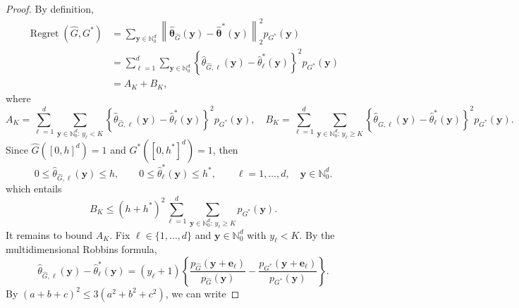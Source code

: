 \documentclass[twoside,12pt]{article}
\begin{document}
\begin{proof}
By definition,
\begin{align*}
    \operatorname{Regret}(\widehat G,G^\ast)
&=
\sum_{\boldsymbol y\in\mathbb N_0^d}
\left\|
\hat{\boldsymbol\theta}_{\widehat G}(\boldsymbol y)
-
\hat{\boldsymbol\theta}^\ast(\boldsymbol y)
\right\|_2^2
p_{G^\ast}(\boldsymbol y)\\
&=
\sum_{\ell=1}^d
\sum_{\boldsymbol y\in\mathbb N_0^d}
\left\{
\hat\theta_{\widehat G,\ell}(\boldsymbol y)
-
\hat\theta_\ell^\ast(\boldsymbol y)
\right\}^2
p_{G^\ast}(\boldsymbol y)\\
&=A_K+B_K,
\end{align*}
where
\[
A_K
=
\sum_{\ell=1}^d
\sum_{\boldsymbol y\in\mathbb N_0^d:\,y_\ell<K}
\left\{
\hat\theta_{\widehat G,\ell}(\boldsymbol y)
-
\hat\theta_\ell^\ast(\boldsymbol y)
\right\}^2
p_{G^\ast}(\boldsymbol y)
,\quad
B_K
=
\sum_{\ell=1}^d
\sum_{\boldsymbol y\in\mathbb N_0^d:\,y_\ell\geq K}
\left\{
\hat\theta_{\widehat G,\ell}(\boldsymbol y)
-
\hat\theta_\ell^\ast(\boldsymbol y)
\right\}^2
p_{G^\ast}(\boldsymbol y).
\]
Since $\widehat G([0,h]^d)=1$ and $G^\ast([0,h^\ast]^d)=1$, then
\[
0\leq \hat\theta_{\widehat G,\ell}(\boldsymbol y)\leq h,
\qquad
0\leq \hat\theta_\ell^\ast(\boldsymbol y)\leq h^\ast,
\qquad
\ell=1,\ldots,d,\quad \boldsymbol y\in\mathbb N_0^d.
\]
which entails 
\[
B_K
\leq
(h+h^\ast)^2
\sum_{\ell=1}^d
\sum_{\boldsymbol y\in\mathbb N_0^d:\,y_\ell\geq K}
p_{G^\ast}(\boldsymbol y).
\]
It remains to bound $A_K$. Fix $\ell\in\{1,\ldots,d\}$ and
$\boldsymbol y\in\mathbb N_0^d$ with $y_\ell<K$. By the multidimensional
Robbins formula,
\[
\hat\theta_{\widehat G,\ell}(\boldsymbol y)
-
\hat\theta_\ell^\ast(\boldsymbol y)
=
(y_\ell+1)
\left\{
\frac{p_{\widehat G}(\boldsymbol y+\boldsymbol e_\ell)}
     {p_{\widehat G}(\boldsymbol y)}
-
\frac{p_{G^\ast}(\boldsymbol y+\boldsymbol e_\ell)}
     {p_{G^\ast}(\boldsymbol y)}
\right\}.
\]
By $(a+b+c)^2\leq 3(a^2+b^2+c^2)$, we can write


\end{proof}
\end{document}
